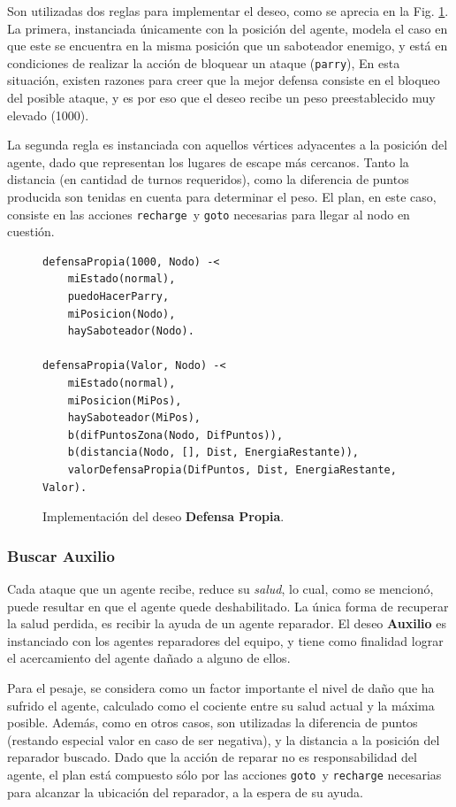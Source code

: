 \documentclass[oneside]{book}
\theoremstyle{definition}
\theoremstyle{example}
\begin{document}
Son utilizadas dos reglas para implementar el deseo, como se aprecia en la Fig. 
\ref{fig:deseoDefensaPropia}.
La primera, instanciada únicamente con la posición del agente, modela el caso en que este se 
encuentra en la misma posición que un saboteador enemigo, y está en condiciones de realizar 
la acción de bloquear un ataque (\texttt{parry}), En esta situación, existen razones para 
creer que la mejor defensa consiste en el bloqueo del posible ataque, y es por eso que el 
deseo recibe un peso preestablecido muy elevado (1000). 

La segunda regla es instanciada con aquellos vértices adyacentes a la posición del agente,
dado que representan los lugares de escape más cercanos. Tanto la distancia (en cantidad de 
turnos requeridos), como la diferencia de puntos producida son tenidas en cuenta para 
determinar el peso. El plan, en este caso, consiste en las acciones \texttt{recharge}\ y 
\texttt{goto} necesarias para llegar al nodo en cuestión.

\begin{figure}
\begin{verbatim}
defensaPropia(1000, Nodo) -<
    miEstado(normal),    
    puedoHacerParry,
    miPosicion(Nodo),
    haySaboteador(Nodo).

defensaPropia(Valor, Nodo) -<
    miEstado(normal),    
    miPosicion(MiPos),    
    haySaboteador(MiPos),
    b(difPuntosZona(Nodo, DifPuntos)),
    b(distancia(Nodo, [], Dist, EnergiaRestante)),
    valorDefensaPropia(DifPuntos, Dist, EnergiaRestante, Valor).
\end{verbatim}
\caption{Implementación del deseo \textbf{Defensa Propia}.}
\label{fig:deseoDefensaPropia}
\end{figure}
	
\subsubsection{Buscar Auxilio}
	
Cada ataque que un agente recibe, reduce su \textit{salud}, lo cual, como se mencionó, 
puede resultar en que el agente quede deshabilitado. La única forma de recuperar la 
salud perdida, es recibir la ayuda de un agente reparador. El deseo \textbf{Auxilio} 
es instanciado con los agentes reparadores del equipo, y tiene como finalidad lograr 
el acercamiento del agente dañado a alguno de ellos.

Para el pesaje, se considera como un factor importante el nivel de daño que ha sufrido 
el agente, calculado como el cociente entre su salud actual y la máxima posible. 
Además, como en otros casos, son utilizadas la diferencia de puntos (restando especial
valor en caso de ser negativa), y la distancia a la posición del reparador buscado. Dado que 
la acción de reparar no es responsabilidad del agente, el plan está compuesto sólo por las
acciones \texttt{goto}\ y \texttt{recharge} necesarias para alcanzar la ubicación del 
reparador, a la espera de su ayuda.
\end{document}

